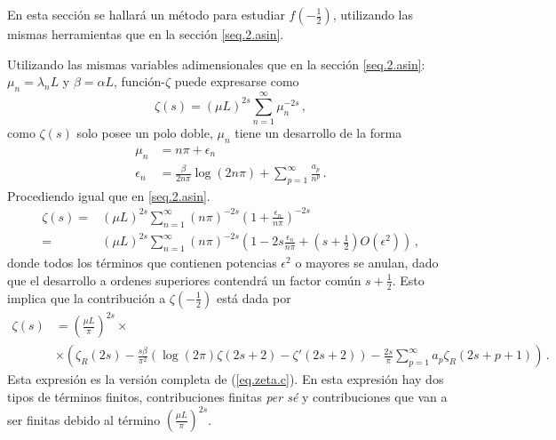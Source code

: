 En esta sección se hallará un método para estudiar $ f \left( - \frac{1}{2} \right)$, utilizando las mismas herramientas que en la sección \ref{seq.2.asin}.

Utilizando las mismas variables adimensionales que en la sección \ref{seq.2.asin}: $\mu _n = \lambda _n L$ y $\beta = \alpha L$, función-$\zeta$ puede expresarse como
\begin{equation}
\zeta (s) = \left( \mu L \right) ^{2s} \sum _{n=1} ^{\infty} \mu _n ^{-2s}
\, ,
\end{equation}
como $\zeta (s)$ solo posee un polo doble, $\mu _n$ tiene un desarrollo de la forma
\begin{equation}
\begin{aligned}
\mu _n  &= 
			n \pi + \epsilon _n \\
			\epsilon _n &= 
			\frac{ \beta }{2 n \pi } \log (2 n \pi) +
			\sum _{p=1} ^{\infty} \frac{a _p}{n ^p }
			\, .
\end{aligned}
\end{equation}
Procediendo igual que en \ref{seq.2.asin}.
\begin{equation}
\begin{aligned}
\zeta (s) =& 
( \mu L ) ^{2s}
\sum _{n=1} ^{\infty}
( n \pi) ^{-2s} \left( 1 + \frac{ \epsilon _n }{n \pi } \right) ^{-2s } \\
 =& 
(\mu L) ^{2s} \sum _{n=1} ^{\infty}
( n \pi) ^{-2s} \left(
						1 -2s  \frac{\epsilon _n}{n \pi} + 
						\left( s + \frac{1}{2} \right) O( \epsilon ^2 )
						\right)
\, ,
\end{aligned}
\end{equation}
donde todos los términos que contienen potencias $\epsilon ^2$ o mayores se anulan, dado que el desarrollo a ordenes superiores contendrá un factor común $s + \frac{1}{2}$. Esto implica que la contribución a $\zeta \left( - \frac{1}{2} \right)$ está dada por
\begin{align}
\zeta (s) &= \left( \frac{\mu L}{\pi} \right) ^{2s} \times \\
			\nonumber
			&\times
			\left(
					\zeta _R (2s) - \frac{s \beta}{\pi ^2} 
						\left(
							\log (2 \pi ) \zeta (2s+2) - \zeta '(2s+2)
							\right)-
					\frac{2 s}{\pi} \sum _{p=1} ^{\infty}
						a _p \zeta _R (2s+p+1)
					\right)
\, .					
\end{align}
Esta expresión es la versión completa de (\ref{eq.zeta.c}).
En esta expresión hay dos tipos de términos finitos, contribuciones finitas {\it per sé} y contribuciones que van a ser finitas debido al término $ \left( \frac{\mu L}{\pi}\right) ^{2s}$.


